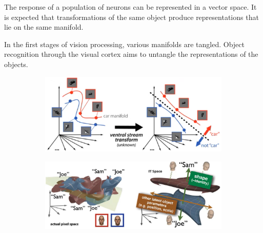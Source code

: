 \begin{casestudy}
    The response of a population of neurons can be represented in a vector space.
    It is expected that transformations of the same object produce representations that lie on the same manifold. 

    In the first stages of vision processing, various manifolds are tangled.
    Object recognition through the visual cortex aims to untangle the representations of the objects.

    \begin{figure}[H]
        \centering
        \begin{subfigure}{0.48\linewidth}
            \centering
            \includegraphics[width=0.95\linewidth]{./img/tangled_vectors.png}
        \end{subfigure}
        \begin{subfigure}{0.48\linewidth}
            \centering
            \includegraphics[width=0.95\linewidth]{./img/tangled_joe_sam.png}
        \end{subfigure}
    \end{figure}
\end{casestudy}


